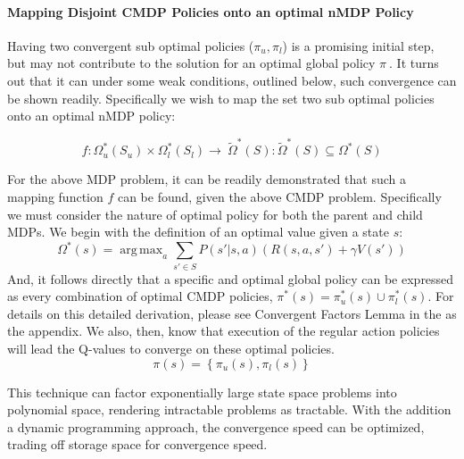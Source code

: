 \documentclass[compsoc,journal,letterpaper,10pt,draftcls,twocolumn]{IEEEtran}
\DeclareMathOperator*{\argmax}{arg\,max}
\begin{document}
\paragraph{Mapping Disjoint CMDP Policies onto an optimal nMDP
Policy}\label{mapping-disjoint-cmdp-policies-onto-an-optimal-nmdp-policy}

Having two convergent sub optimal policies (\(\pi_{u},\pi_{l}\)) is a
promising initial step, but may not contribute to the solution for an
optimal global policy \(\pi_{\ }.\) It turns out that it can under some
weak conditions, outlined below, such convergence can be shown readily.
Specifically we wish to map the set two sub optimal policies onto an
optimal nMDP policy:

\begin{equation}
f:\Omega_{u}^{*}\left( S_{u} \right) \times \Omega_{l}^{*}\left( S_{l} \right) \rightarrow \ {\tilde{\Omega}}^{*}\left( S \right):{\tilde{\Omega}}^{*}\left( S \right) \subseteq \Omega^{*}\left( S \right)
\end{equation}
 

For the above MDP problem, it can be readily demonstrated that such a
mapping function \(f\) can be found, given the above CMDP problem.
Specifically we must consider the nature of optimal policy for both the
parent and child MDPs. We begin with the definition of an optimal value
given a state \(s\):
\begin{equation}
\Omega^{*}(s) = \argmax_{a}\sum_{s' \in S}P\left( s'|s,a \right)\left( R\left( s, a, s' \right) + \gamma V\left( s' \right) \right)
\end{equation}
And, it follows directly that a specific and optimal global policy can
be expressed as every combination of optimal CMDP policies,
\(\pi^{*}\left( s \right) = \pi_{u}^{*}\left( s \right) \cup \pi_{l}^{*}\left( s \right)\).
For details on this detailed derivation, please see Convergent Factors
Lemma in the as the appendix. We also, then, know that execution of the
regular action policies will lead the Q-values to converge on these
optimal policies.
\begin{equation}
\pi\left( s \right) = \left\{ \pi_{u}\left( s \right),\pi_{l}\left( s \right) \right\}
\end{equation}

This technique can factor exponentially large state space problems into
polynomial space, rendering intractable problems as tractable. With the
addition a dynamic programming approach, the convergence speed can be
optimized, trading off storage space for convergence speed.
\end{document}
